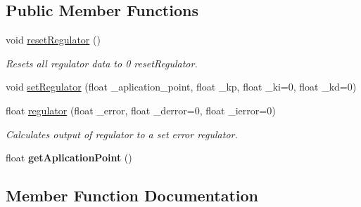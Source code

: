 \subsection*{Public Member Functions}
\begin{DoxyCompactItemize}
\item 
void \hyperlink{classRHATypes_1_1FuzzyRegulatorNode_a86a9b1665447aa252262ad8153396f82}{reset\+Regulator} ()\hypertarget{classRHATypes_1_1FuzzyRegulatorNode_a86a9b1665447aa252262ad8153396f82}{}\label{classRHATypes_1_1FuzzyRegulatorNode_a86a9b1665447aa252262ad8153396f82}

\begin{DoxyCompactList}\small\item\em Resets all regulator data to 0  reset\+Regulator. \end{DoxyCompactList}\item 
void \hyperlink{classRHATypes_1_1FuzzyRegulatorNode_a60721c08c235e72fa7da03b4830ead4f}{set\+Regulator} (float \+\_\+aplication\+\_\+point, float \+\_\+kp, float \+\_\+ki=0, float \+\_\+kd=0)
\item 
float \hyperlink{classRHATypes_1_1FuzzyRegulatorNode_a009b61474e7af7d368239919dcb21f3b}{regulator} (float \+\_\+error, float \+\_\+derror=0, float \+\_\+ierror=0)
\begin{DoxyCompactList}\small\item\em Calculates output of regulator to a set error  regulator. \end{DoxyCompactList}\item 
float {\bfseries get\+Aplication\+Point} ()\hypertarget{classRHATypes_1_1FuzzyRegulatorNode_a488e3dcd8360401850a0203949dfc17e}{}\label{classRHATypes_1_1FuzzyRegulatorNode_a488e3dcd8360401850a0203949dfc17e}

\end{DoxyCompactItemize}


\subsection{Member Function Documentation}
